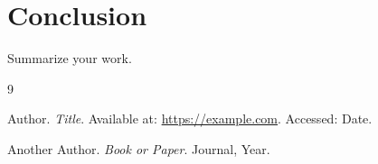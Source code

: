 \documentclass{article}
\begin{document}
\section{Conclusion}
Summarize your work.

\begin{thebibliography}{9}

Author. \textit{Title}. Available at: \url{https://example.com}. Accessed: Date.

Another Author. \textit{Book or Paper}. Journal, Year.

\end{thebibliography}
\end{document}
